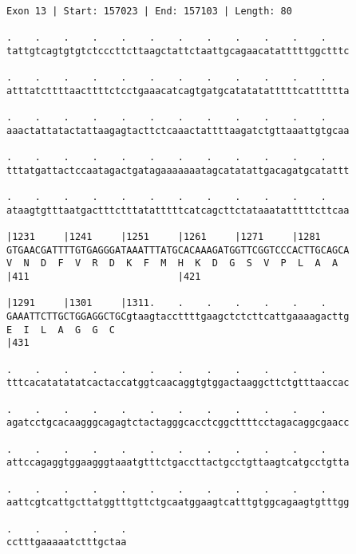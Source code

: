 \documentclass{article}
\begin{document}
\begin{Verbatim}[fontfamily=courier]
Exon 13 | Start: 157023 | End: 157103 | Length: 80

.    .    .    .    .    .    .    .    .    .    .    .    
tattgtcagtgtgtctcccttcttaagctattctaattgcagaacatatttttggctttc

.    .    .    .    .    .    .    .    .    .    .    .    
atttatcttttaacttttctcctgaaacatcagtgatgcatatatatttttcatttttta

.    .    .    .    .    .    .    .    .    .    .    .    
aaactattatactattaagagtacttctcaaactattttaagatctgttaaattgtgcaa

.    .    .    .    .    .    .    .    .    .    .    .    
tttatgattactccaatagactgatagaaaaaaatagcatatattgacagatgcatattt

.    .    .    .    .    .    .    .    .    .    .    .    
ataagtgtttaatgactttctttatatttttcatcagcttctataaatatttttcttcaa

|1231     |1241     |1251     |1261     |1271     |1281     
GTGAACGATTTTGTGAGGGATAAATTTATGCACAAAGATGGTTCGGTCCCACTTGCAGCA
V  N  D  F  V  R  D  K  F  M  H  K  D  G  S  V  P  L  A  A  
|411                          |421                          

|1291     |1301     |1311.    .    .    .    .    .    .    
GAAATTCTTGCTGGAGGCTGCgtaagtaccttttgaagctctcttcattgaaaagacttg
E  I  L  A  G  G  C                                         
|431                                                        

.    .    .    .    .    .    .    .    .    .    .    .    
tttcacatatatatcactaccatggtcaacaggtgtggactaaggcttctgtttaaccac

.    .    .    .    .    .    .    .    .    .    .    .    
agatcctgcacaagggcagagtctactagggcacctcggcttttcctagacaggcgaacc

.    .    .    .    .    .    .    .    .    .    .    .    
attccagaggtggaagggtaaatgtttctgaccttactgcctgttaagtcatgcctgtta

.    .    .    .    .    .    .    .    .    .    .    .    
aattcgtcattgcttatggtttgttctgcaatggaagtcatttgtggcagaagtgtttgg

.    .    .    .    .
cctttgaaaaatctttgctaa
\end{Verbatim}
\newpage
\end{document}
